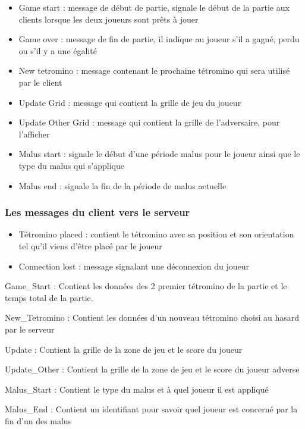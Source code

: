 \documentclass[a4paper, 12pt]{article}
\begin{document}
				\begin{itemize}
					\item Game start : message de début de partie, signale le début de la partie aux clients lorsque les deux joueurs sont prêts à jouer
					\item Game over : message de fin de partie, il indique au joueur s'il a gagné, perdu ou s'il y a une égalité
					\item New tetromino : message contenant le prochaine tétromino qui sera utilisé par le client
					\item Update Grid : message qui contient la grille de jeu du joueur
					\item Update Other Grid : message qui contient la grille de l'adversaire, pour l'afficher
					\item Malus start : signale le début d'une période malus pour le joueur ainsi que le type du malus qui s'applique
					\item Malus end : signale la fin de la période de malus actuelle
				\end{itemize}

			\subsubsection{Les messages du client vers le serveur}

				\begin{itemize}
					\item Tétromino placed : contient le tétromino avec sa position et son orientation tel qu'il viens d'être placé par le joueur
					\item Connection lost : message signalant une déconnexion du joueur
				\end{itemize}


Game\_Start : 
    Contient les données des 2 premier tétromino de la partie et le temps total de la partie.

New\_Tetromino :
    Contient les données d’un nouveau tétromino choisi au hasard par le serveur

Update : 
    Contient la grille de la zone de jeu et le score du joueur

Update\_Other :
    Contient la grille de la zone de jeu et le score du joueur adverse

Malus\_Start : 
    Contient le type du malus et à quel joueur il est appliqué

Malus\_End :
    Contient un identifiant pour savoir quel joueur est concerné par la fin d’un des malus
\end{document}

